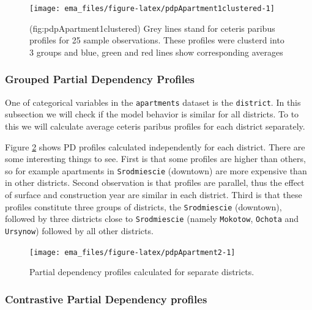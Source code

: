 \documentclass[12pt,]{krantz}
\begin{document}
\begin{figure}

{\centering \texttt{[image: ema\_files/figure-latex/pdpApartment1clustered-1]} 

}

\caption{(fig:pdpApartment1clustered) Grey lines stand for ceteris paribus profiles for 25 sample observations. These profiles were clusterd into 3 groups and blue, green and red lines show corresponding averages}\label{fig:pdpApartment1clustered}
\end{figure}

\hypertarget{grouped-partial-dependency-profiles-1}{%
\subsubsection{Grouped Partial Dependency Profiles}\label{grouped-partial-dependency-profiles-1}}

One of categorical variables in the \texttt{apartments} dataset is the \texttt{district}. In this subsection we will check if the model behavior is similar for all districts. To to this we will calculate average ceteris paribus profiles for each district separately.

Figure \ref{fig:pdpApartment2} shows PD profiles calculated independently for each district. There are some interesting things to see. First is that some profiles are higher than others, so for example apartments in \texttt{Srodmiescie} (downtown) are more expensive than in other districts. Second observation is that profiles are parallel, thus the effect of surface and construction year are similar in each district. Third is that these profiles constitute three groups of districts, the \texttt{Srodmiescie} (downtown), followed by three districts close to \texttt{Srodmiescie} (namely \texttt{Mokotow}, \texttt{Ochota} and \texttt{Ursynow}) followed by all other districts.

\begin{figure}

{\centering \texttt{[image: ema\_files/figure-latex/pdpApartment2-1]} 

}

\caption{Partial dependency profiles calculated for separate districts.}\label{fig:pdpApartment2}
\end{figure}

\hypertarget{contrastive-partial-dependency-profiles-1}{%
\subsubsection{Contrastive Partial Dependency profiles}\label{contrastive-partial-dependency-profiles-1}}
\end{document}
